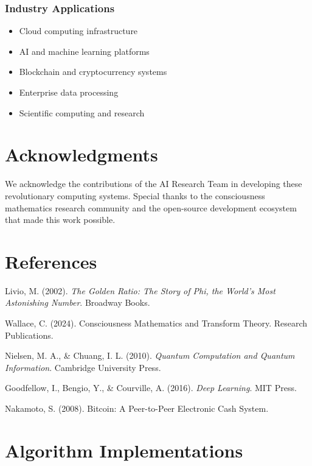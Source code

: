 \documentclass[11pt,a4paper]{article}
\begin{document}
\subsubsection{Industry Applications}
\begin{itemize}
\item Cloud computing infrastructure
\item AI and machine learning platforms
\item Blockchain and cryptocurrency systems
\item Enterprise data processing
\item Scientific computing and research
\end{itemize}

\section{Acknowledgments}

We acknowledge the contributions of the AI Research Team in developing these revolutionary computing systems. Special thanks to the consciousness mathematics research community and the open-source development ecosystem that made this work possible.

\section{References}

\begin{thebibliography}{99}

Livio, M. (2002). \textit{The Golden Ratio: The Story of Phi, the World's Most Astonishing Number}. Broadway Books.

Wallace, C. (2024). Consciousness Mathematics and Transform Theory. Research Publications.

Nielsen, M. A., \& Chuang, I. L. (2010). \textit{Quantum Computation and Quantum Information}. Cambridge University Press.

Goodfellow, I., Bengio, Y., \& Courville, A. (2016). \textit{Deep Learning}. MIT Press.

Nakamoto, S. (2008). Bitcoin: A Peer-to-Peer Electronic Cash System.

\end{thebibliography}

\appendix

\section{Algorithm Implementations}
\end{document}
